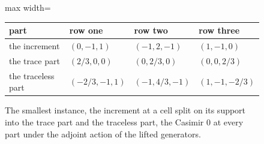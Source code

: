 \begin{figure}[h]
\centering
\begin{adjustbox}{max width=\linewidth}\begin{tabular}{llll}
\hline
part & row one & row two & row three \\
\hline
the increment & $(0, -1, 1)$ & $(-1, 2, -1)$ & $(1, -1, 0)$ \\
the trace part & $(2/3, 0, 0)$ & $(0, 2/3, 0)$ & $(0, 0, 2/3)$ \\
the traceless part & $(-2/3, -1, 1)$ & $(-1, 4/3, -1)$ & $(1, -1, -2/3)$ \\
\hline
\end{tabular}\end{adjustbox}
\caption{The smallest instance, the increment at a cell split on its support into the trace part and the traceless part, the Casimir 0 at every part under the adjoint action of the lifted generators.}
\end{figure}

